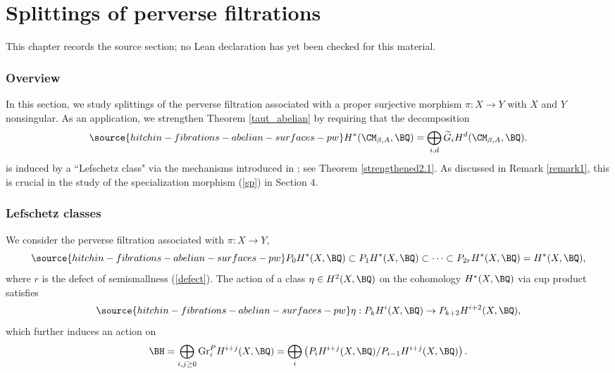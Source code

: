 \chapter{Splittings of perverse filtrations}
\label{hitchin-fibrations-abelian-surfaces-pw-chapter-06}

\begin{remark}
\label{hitchin-fibrations-abelian-surfaces-pw-chapter-06-source}
This chapter records the source section; no Lean declaration has yet been checked for this material.
\notready
\end{remark}

\subsection{Overview}
In this section, we study splittings of the perverse filtration associated with a proper surjective morphism $\pi: X\to Y$ with $X$ and $Y$ nonsingular. As an application, we strengthen Theorem \ref{taut_abelian} by requiring that the decomposition
\begin{equation}\label{decomp6}
\source{hitchin-fibrations-abelian-surfaces-pw}
H^\ast(\CM_{\beta, A}, \BQ) = \bigoplus_{i,d} \widetilde{G}_iH^d(\CM_{\beta, A}, \BQ).
\end{equation}
is induced by a ``Lefschetz class" via the mechanisms introduced in \cite{D,dC,dCM4}; see Theorem \ref{strengthened2.1}. As discussed in Remark \ref{remark1}, this is crucial in the study of the specialization morphism (\ref{sp}) in Section 4.

\subsection{Lefschetz classes}
We consider the perverse filtration associated with $\pi: X \to Y$,
\begin{equation}\label{e50}
\source{hitchin-fibrations-abelian-surfaces-pw}
P_0H^\ast(X, \BQ) \subset P_1H^\ast(X, \BQ) \subset \dots \subset P_{2r}H^\ast(X, \BQ) =  H^\ast(X, \BQ),
\end{equation}
where $r$ is the defect of semismallness (\ref{defect}). The action of a class $\eta \in H^2(X, \BQ)$ on the cohomology $H^*(X, \BQ)$ via cup product satisfies
\begin{equation}\label{e51}
\source{hitchin-fibrations-abelian-surfaces-pw}
\eta: P_kH^i(X, \BQ) \to P_{k+2}H^{i+2}(X, \BQ),
\end{equation}
which further induces an action on
\[
\BH = \bigoplus_{i,j\geq 0} \mathrm{Gr}_i^P H^{i+j}(X, \BQ)= \bigoplus_i \left( P_iH^{i+j}(X, \BQ)/P_{i-1}H^{i+j}(X, \BQ) \right).
\]

